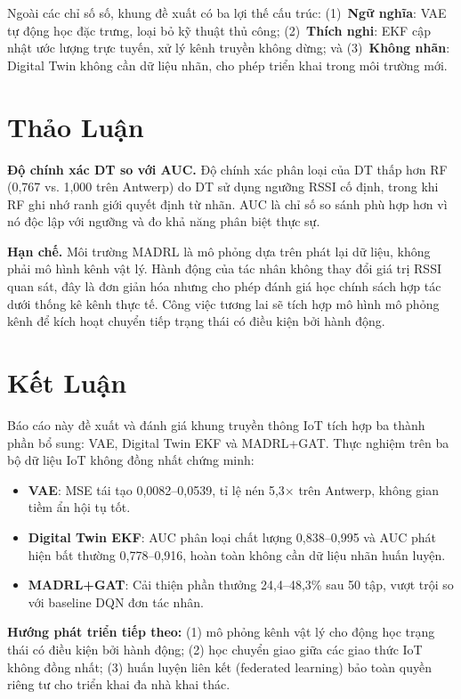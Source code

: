 \documentclass[12pt, a4paper]{article}
\begin{document}
Ngoài các chỉ số số, khung đề xuất có ba lợi thế cấu trúc:
(1)~\textbf{Ngữ nghĩa}: VAE tự động học đặc trưng, loại bỏ kỹ
thuật thủ công;
(2)~\textbf{Thích nghi}: EKF cập nhật ước lượng trực tuyến, xử
lý kênh truyền không dừng; và
(3)~\textbf{Không \mbox{nhãn}}: Digital Twin không cần dữ liệu \mbox{nhãn},
cho phép triển khai trong môi trường mới.

\section{Thảo Luận}
\label{sec:discussion}

\textbf{Độ chính xác DT so với AUC.}
Độ chính xác phân loại của DT thấp hơn RF (0,767 vs. 1,000 trên
Antwerp) do DT sử dụng ngưỡng RSSI cố định, trong khi RF ghi nhớ
ranh giới quyết định từ \mbox{nhãn}. AUC là chỉ số so sánh phù hợp hơn
vì nó độc lập với ngưỡng và đo khả năng phân biệt thực sự.

\textbf{Hạn chế.}
Môi trường MADRL là mô phỏng dựa trên phát lại dữ liệu, không
phải mô hình kênh vật lý. Hành động của tác nhân không thay đổi
giá trị RSSI quan sát, đây là đơn giản hóa nhưng cho phép đánh
giá học chính sách hợp tác dưới thống kê kênh thực tế. Công việc
tương lai sẽ tích hợp mô hình mô phỏng kênh để kích hoạt chuyển
tiếp trạng thái có điều kiện bởi hành động.

\section{Kết Luận}
\label{sec:conclusion}

Báo cáo này đề xuất và đánh giá khung truyền thông IoT tích hợp
ba thành phần bổ sung: VAE, Digital Twin EKF và MADRL+GAT.
Thực nghiệm trên ba bộ dữ liệu IoT không đồng nhất chứng minh:

\begin{itemize}
  \item \textbf{VAE}: MSE tái tạo 0,0082--0,0539, tỉ lệ nén
        5,3$\times$ trên Antwerp, không gian tiềm ẩn hội tụ tốt.
  \item \textbf{Digital Twin EKF}: AUC phân loại chất lượng
        0,838--0,995 và AUC phát hiện bất thường 0,778--0,916,
        hoàn toàn không cần dữ liệu \mbox{nhãn} huấn luyện.
  \item \textbf{MADRL+GAT}: Cải thiện phần thưởng 24,4--48,3\%
        sau 50 tập, vượt trội so với baseline DQN đơn tác nhân.
\end{itemize}

\textbf{Hướng phát triển tiếp theo:}
(1) mô phỏng kênh vật lý cho động học trạng thái có điều kiện
bởi hành động;
(2) học chuyển giao giữa các giao thức IoT không đồng nhất;
(3) huấn luyện liên kết (federated learning) bảo toàn quyền
riêng tư cho triển khai đa nhà khai thác.
\end{document}

